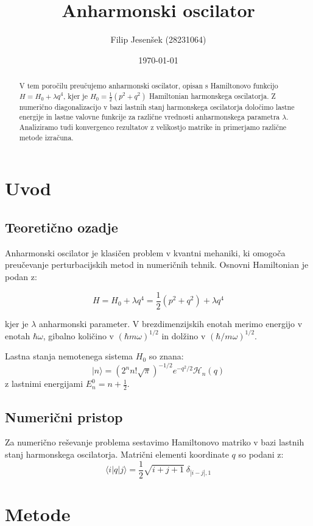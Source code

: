 \documentclass[12pt,a4paper]{article}
\title{Anharmonski oscilator}
\author{Filip Jesenšek (28231064)}
\date{\today}
\begin{document}
\maketitle

\begin{abstract}
V tem poročilu preučujemo anharmonski oscilator, opisan s Hamiltonovo funkcijo $H = H_0 + \lambda q^4$, 
kjer je $H_0 = \frac{1}{2}(p^2 + q^2)$ Hamiltonian harmonskega oscilatorja. 
Z numerično diagonalizacijo v bazi lastnih stanj harmonskega oscilatorja določimo lastne energije in 
lastne valovne funkcije za različne vrednosti anharmonskega parametra $\lambda$. 
Analiziramo tudi konvergenco rezultatov z velikostjo matrike in primerjamo različne metode izračuna.
\end{abstract}

\tableofcontents

\newpage

\section{Uvod}

\subsection{Teoretično ozadje}
Anharmonski oscilator je klasičen problem v kvantni mehaniki, 
ki omogoča preučevanje perturbacijskih metod in numeričnih tehnik. 
Osnovni Hamiltonian je podan z:

\[
H = H_0 + \lambda q^4 = \frac{1}{2}(p^2 + q^2) + \lambda q^4
\]

kjer je $\lambda$ anharmonski parameter. 
V brezdimenzijskih enotah merimo energijo v enotah $\hbar\omega$, 
gibalno količino v $(\hbar m\omega)^{1/2}$ in dolžino v $(\hbar/m\omega)^{1/2}$.

Lastna stanja nemotenega sistema $H_0$ so znana:
\[
|n\rangle = (2^n n! \sqrt{\pi})^{-1/2} e^{-q^2/2} \mathcal{H}_n(q)
\]
z lastnimi energijami $E_n^0 = n + \frac{1}{2}$.

\subsection{Numerični pristop}
Za numerično reševanje problema sestavimo Hamiltonovo matriko v bazi lastnih stanj harmonskega oscilatorja. 
Matrični elementi koordinate $q$ so podani z:
\[
\langle i|q|j\rangle = \frac{1}{2}\sqrt{i+j+1}\ \delta_{|i-j|,1}
\]

\section{Metode}
\end{document}
